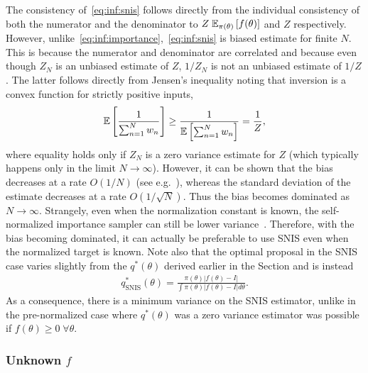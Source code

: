 The consistency of~\eqref{eq:inf:snis} follows
directly from the individual consistency of both the numerator and the denominator to 
$Z\;\mathbb{E}_{\pi(\theta)} \left[f(\theta)\right]$ and $Z$ respectively.
However, unlike~\eqref{eq:inf:importance},~\eqref{eq:inf:snis} is biased estimate
for finite $N$.  This is
because the numerator and denominator are correlated and because 
even though $Z_N$ is an unbiased estimate of $Z$, $1/Z_N$ is not an unbiased
estimate of $1/Z$. The latter follows directly from Jensen's inequality
noting that inversion is a convex function for strictly positive inputs,
\begin{align}
\mathbb{E} \left[\frac{1}{\sum_{n=1}^{N} w_n}\right] \ge \frac{1}{\mathbb{E} \left[\sum_{n=1}^{N} w_n\right]} = \frac{1}{Z},
\end{align}
where equality holds only if $Z_N$ is a zero variance estimate for $Z$ (which
typically happens only in the limit $N\rightarrow\infty$).  However, it can be shown that the
bias decreases at a rate $O(1/N)$ (see e.g.~\cite{doucet2009tutorial}), whereas the
standard deviation of the estimate decreases at a rate $O(1/\sqrt{N})$.  Thus the bias
becomes dominated as $N\rightarrow\infty$.
Strangely, even when the normalization constant
is known, the self-normalized importance sampler can still be lower variance~\citep{owen2013mc}.
Therefore, with the bias becoming dominated, it can actually be preferable to use
SNIS even when the normalized target is known.  Note also that the optimal proposal in
the SNIS case varies slightly from the $q^*(\theta)$ derived earlier in the Section
and is instead~\citep{hesterberg1988advances}
\begin{align}
q^*_{\mathrm{SNIS}} (\theta) = \frac{\pi(\theta)\left|f(\theta)-I\right|}
{\int \pi(\theta)\left|f(\theta)-I\right|d\theta}.
\end{align}
As a consequence, there is a minimum variance on the SNIS estimator, unlike in the
pre-normalized case where $q^*(\theta)$ was a zero variance estimator  was possible
if $f(\theta)\ge0 \; \forall \theta$.

\subsubsection{Unknown $f$}
\label{sec:inf:foundation:importance:unk-f}

